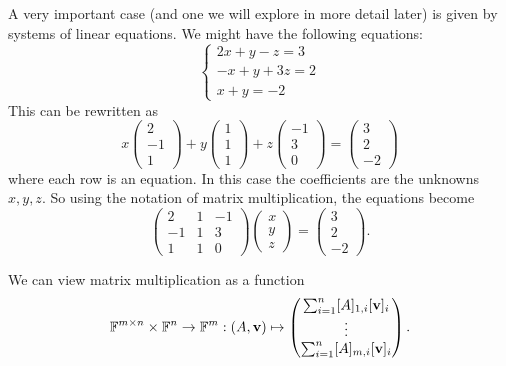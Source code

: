 \begin{example}
A very important case (and one we will explore in more detail later) is given by systems of linear equations. We might have the following equations:
\[ \begin{cases}
2x + y -z = 3 \\
-x + y +3z = 2 \\
x+y = -2
\end{cases} \]
This can be rewritten as
\[ x\begin{pmatrix}
2 \\-1 \\ 1
\end{pmatrix} + y \begin{pmatrix}
1 \\1 \\ 1
\end{pmatrix} + z\begin{pmatrix}
-1 \\ 3 \\ 0
\end{pmatrix} = \begin{pmatrix}
3 \\2 \\ -2
\end{pmatrix} \]
where each row is an equation. In this case the coefficients are the unknowns $x,y,z$. So using the notation of matrix multiplication, the equations become
\[ \begin{pmatrix}
2 & 1 & -1 \\
-1 & 1 & 3 \\
1 & 1 & 0
\end{pmatrix}\begin{pmatrix}
x \\ y \\ z
\end{pmatrix} = \begin{pmatrix}
3 \\ 2 \\ -2
\end{pmatrix}. \]
\end{example}

We can view matrix multiplication as a function
\[ \mathbb{F}^{m\times n}\times \mathbb{F}^n \to \mathbb{F}^m: (A,\boldsymbol{\mathrm{v}}) \mapsto \begin{pmatrix}
\sum_{i=1}^n [A]_{1,i}[\boldsymbol{\mathrm{v}}]_i \\ \vdots \\ \sum_{i=1}^n [A]_{m,i}[\boldsymbol{\mathrm{v}}]_i
\end{pmatrix}. \]


